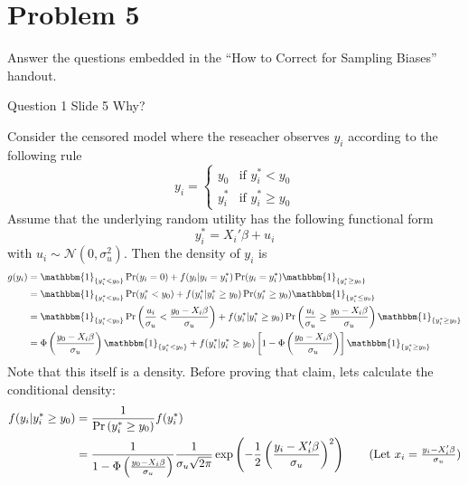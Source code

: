 \documentclass{article}
\begin{document}
\section*{Problem 5}
Answer the questions embedded in the ``How to Correct for Sampling Biases'' handout.

\begin{problem}{Question 1 Slide 5}
Why?
\end{problem}
\begin{solution}
Consider the censored model where the reseacher observes $y_i$ according to the following rule 
\begin{equation*}
    y_i = \begin{cases}
        y_0 &\mbox{if } y^*_i< y_0 \\ 
        y_i^* &\mbox{if } y^*_i\geq y_0
    \end{cases}
\end{equation*}
Assume that the underlying random utility has the following functional form
\begin{equation*}
 y_i^* = X_i'\beta + u_i
\end{equation*}
with $u_i\sim\mathcal{N}(0,\sigma_u^2)$. Then the density of $y_i$ is 
\begin{align*}
    g(y_i) &= \mathbbm{1}_{\{y_i^*<y_0\}}\Pr(y_i=0) + f(y_i\vert y_i=y_i^*)\Pr(y_i = y_i^*)\mathbbm{1}_{\{y_i^*\geq y_0\}} \\ 
    &= \mathbbm{1}_{\{y_i^*<y_0\}}\Pr(y_i^*<y_0) + f(y_i^*\vert y_i^*\geq y_0)\Pr(y_i^*\geq y_0)\mathbbm{1}_{\{y_i^*\leq y_0\}} \\
    &= \mathbbm{1}_{\{y_i^*<y_0\}}\Pr\left(\frac{u_i}{\sigma_u}<\frac{y_0-X_i\beta}{\sigma_u}\right) + f(y_i^*\vert y_i^*\geq y_0)\Pr\left(\frac{u_i}{\sigma_u}\geq\frac{y_0-X_i\beta}{\sigma_u}\right)\mathbbm{1}_{\{y_i^*\geq y_0\}} \\ 
    &= \Phi\left(\frac{y_0-X_i\beta}{\sigma_u}\right)\mathbbm{1}_{\{y_i^*<y_0\}} + f(y_i^*\vert y_i^*\geq y_0)\left[1-\Phi\left(\frac{y_0-X_i\beta}{\sigma_u}\right)\right]\mathbbm{1}_{\{y_i^*\geq y_0\}}
\end{align*}
Note that this itself is a density. Before proving that claim, lets calculate the conditional density:
\begin{align*}
    f(y_i\vert y_i^*\geq y_0) &= \frac{1}{\Pr\left(y_i^*\geq y_0\right)}f(y_i^*) \\ 
    &= \frac{1}{1-\Phi\left(\frac{y_0-X_i\beta}{\sigma_u}\right)} \frac{1}{\sigma_u\sqrt{2\pi}} \exp\left(-\frac{1}{2}\left(\frac{y_i-X_i'\beta}{\sigma_u}\right)^2\right) \tag{Let $x_i=\frac{y_i-X_i'\beta}{\sigma_u}$} \\ 

\end{align*}
\end{solution}
\end{document}
